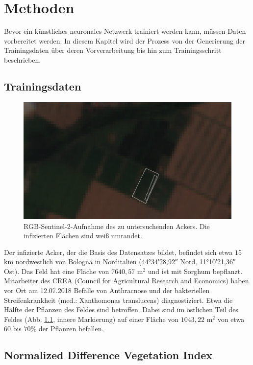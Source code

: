 \chapter{Methoden}\label{chap:methods}

Bevor ein künstliches neuronales Netzwerk trainiert werden kann, müssen Daten vorbereitet werden. In diesem Kapitel wird der Prozess von der Generierung der Trainingsdaten über deren Vorverarbeitung bis hin zum Trainingsschritt beschrieben.

\section{Trainingsdaten}\label{sec:data}
\begin{figure}[ht]
  \centering
  \includegraphics[width=.7\textwidth]{pics/roi.png}
  \caption[Region of Interest]{RGB-Sentinel-2-Aufnahme des zu untersuchenden Ackers. Die infizierten Flächen sind weiß umrandet. }
  \label{fig:roi}
\end{figure}
\noindent
Der infizierte Acker, der die Basis des Datensatzes bildet, befindet sich etwa $15$ km nordwestlich von Bologna in Norditalien (\ang{44;34;28,92} Nord, \ang{11;10;21,36} Ost). Das Feld hat eine Fläche von $7640,57$ m$^2$ und ist mit Sorghum bepflanzt. Mitarbeiter des CREA (Council for Agricultural Research and Economics) haben vor Ort am 12.07.2018 Befälle von Anthracnose und der bakteriellen Streifenkrankheit (med.: Xanthomonas translucens) diagnostiziert. Etwa die Hälfte der Pflanzen des Feldes sind betroffen. Dabei sind im östlichen Teil des Feldes (Abb. \ref{fig:roi}, innere Markierung) auf einer Fläche von $1043,22$ m$^2$ von etwa $60$ bis $70\%$ der Pflanzen befallen.

\section{Normalized Difference Vegetation Index}\label{sec:ndvi}

